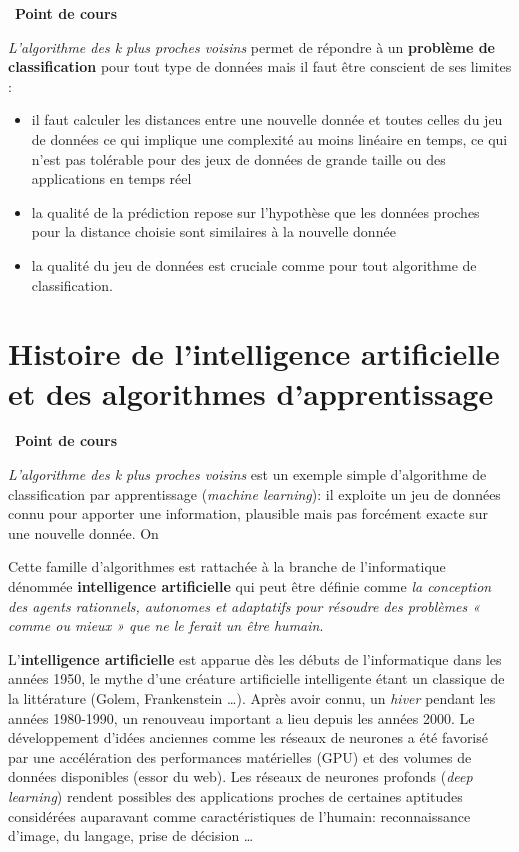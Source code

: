 \documentclass[
  11pt,
]{article}
\providecommand{\tightlist}{%
  \setlength{\itemsep}{0pt}\setlength{\parskip}{0pt}}
\newcounter{thme}
\newcounter{cours}
\newenvironment{cours}[1]
{\par \medskip   \addtocounter{cours}{1} \noindent  
\begin{bclogo}[arrondi =0.1,  ombre = true, barre=none, logo=\bcbook, marge=4]{~\textbf{Point de cours} \textbf{\thecours} {\itshape #1} }  \par}
{
\end{bclogo}
 \par \bigskip }
\newcounter{alg}
\newcounter{histo}
\begin{document}
\begin{cours}{}

\emph{L'algorithme des k plus proches voisins} permet de répondre à un
\textbf{problème de classification} pour tout type de données mais il
faut être conscient de ses limites :

\begin{itemize}
\tightlist
\item
  il faut calculer les distances entre une nouvelle donnée et toutes
  celles du jeu de données ce qui implique une complexité au moins
  linéaire en temps, ce qui n'est pas tolérable pour des jeux de données
  de grande taille ou des applications en temps réel
\item
  la qualité de la prédiction repose sur l'hypothèse que les données
  proches pour la distance choisie sont similaires à la nouvelle donnée
\item
  la qualité du jeu de données est cruciale comme pour tout algorithme
  de classification.
\end{itemize}

\end{cours}

\hypertarget{histoire-de-lintelligence-artificielle-et-des-algorithmes-dapprentissage}{%
\section{Histoire de l'intelligence artificielle et des algorithmes
d'apprentissage}\label{histoire-de-lintelligence-artificielle-et-des-algorithmes-dapprentissage}}

\begin{cours}{}

\emph{L'algorithme des k plus proches voisins} est un exemple simple
d'algorithme de classification par apprentissage (\emph{machine
learning}): il exploite un jeu de données connu pour apporter une
information, plausible mais pas forcément exacte sur une nouvelle
donnée. On

Cette famille d'algorithmes est rattachée à la branche de l'informatique
dénommée \textbf{intelligence artificielle} qui peut être définie comme
\emph{la conception des agents rationnels, autonomes et adaptatifs pour
résoudre des problèmes « comme ou mieux » que ne le ferait un être
humain}.

L'\textbf{intelligence artificielle} est apparue dès les débuts de
l'informatique dans les années 1950, le mythe d'une créature
artificielle intelligente étant un classique de la littérature (Golem,
Frankenstein \ldots). Après avoir connu, un \emph{hiver} pendant les
années 1980-1990, un renouveau important a lieu depuis les années 2000.
Le développement d'idées anciennes comme les réseaux de neurones a été
favorisé par une accélération des performances matérielles (GPU) et des
volumes de données disponibles (essor du web). Les réseaux de neurones
profonds (\emph{deep learning}) rendent possibles des applications
proches de certaines aptitudes considérées auparavant comme
caractéristiques de l'humain: reconnaissance d'image, du langage, prise
de décision \ldots{}

\end{cours}
\end{document}
